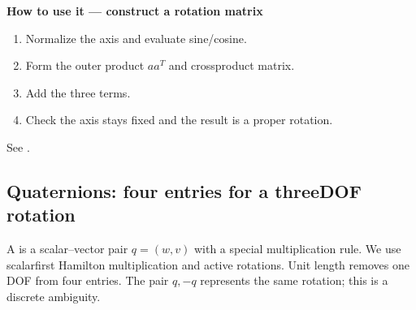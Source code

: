 \documentclass[letterpaper,11pt,english,openany,oneside]{jupyterBook}
\begin{document}
\begin{TextbookBox}
\textbf{How to use it — construct a rotation matrix}\par\smallskip
\begin{enumerate}
%
\item {}
\sphinxAtStartPar
Normalize the axis and evaluate sine/cosine.

\item {}
\sphinxAtStartPar
Form the outer product \(aa^T\) and cross\sphinxhyphen{}product matrix.

\item {}
\sphinxAtStartPar
Add the three terms.

\item {}
\sphinxAtStartPar
Check the axis stays fixed and the result is a proper rotation.

\end{enumerate}

\sphinxAtStartPar
See {\hyperref[\detokenize{lectures/lecture01/rotations:ex-lec01-quaternion}]{}}.

\end{TextbookBox}


\subsection{Quaternions: four entries for a three\sphinxhyphen{}DOF rotation}
\label{\detokenize{lectures/lecture01/rotations:quaternions-four-entries-for-a-three-dof-rotation}}
\sphinxAtStartPar
A  is a scalar–vector pair \(q=(w,v)\) with a special multiplication rule. We use scalar\sphinxhyphen{}first Hamilton multiplication and active rotations. Unit length removes one DOF from four entries. The pair \(q,-q\) represents the same rotation; this is a discrete ambiguity.
\end{document}
